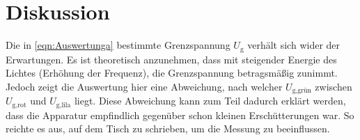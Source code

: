 \section{Diskussion}
\label{sec:Diskussion}

Die in \autoref{eqn:Auswertunga} bestimmte Grenzspannung $U_{\text{g}}$ verhält sich wider der Erwartungen. Es ist theoretisch anzunehmen, dass mit steigender Energie des Lichtes (Erhöhung der Frequenz), die Grenzspannung betragsmäßig 
zunimmt. Jedoch zeigt die Auswertung hier eine Abweichung, nach welcher $U_{\text{g,grün}}$ zwischen $U_{\text{g,rot}}$ und $U_{\text{g,lila}}$ liegt. 
Diese Abweichung kann zum Teil dadurch erklärt werden, dass die Apparatur empfindlich gegenüber schon kleinen Erschütterungen war. So reichte es aus, auf dem Tisch zu schrieben, um die Messung zu beeinflussen.